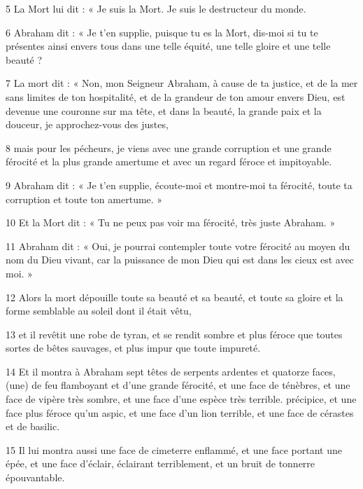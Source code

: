 \par 5 La Mort lui dit : « Je suis la Mort. Je suis le destructeur du monde.

\par 6 Abraham dit : « Je t'en supplie, puisque tu es la Mort, dis-moi si tu te présentes ainsi envers tous dans une telle équité, une telle gloire et une telle beauté ?

\par 7 La mort dit : « Non, mon Seigneur Abraham, à cause de ta justice, et de la mer sans limites de ton hospitalité, et de la grandeur de ton amour envers Dieu, est devenue une couronne sur ma tête, et dans la beauté, la grande paix et la douceur, je approchez-vous des justes,

\par 8 mais pour les pécheurs, je viens avec une grande corruption et une grande férocité et la plus grande amertume et avec un regard féroce et impitoyable.

\par 9 Abraham dit : « Je t’en supplie, écoute-moi et montre-moi ta férocité, toute ta corruption et toute ton amertume. »

\par 10 Et la Mort dit : « Tu ne peux pas voir ma férocité, très juste Abraham. »

\par 11 Abraham dit : « Oui, je pourrai contempler toute votre férocité au moyen du nom du Dieu vivant, car la puissance de mon Dieu qui est dans les cieux est avec moi. »

\par 12 Alors la mort dépouille toute sa beauté et sa beauté, et toute sa gloire et la forme semblable au soleil dont il était vêtu,

\par 13 et il revêtit une robe de tyran, et se rendit sombre et plus féroce que toutes sortes de bêtes sauvages, et plus impur que toute impureté.

\par 14 Et il montra à Abraham sept têtes de serpents ardentes et quatorze faces, (une) de feu flamboyant et d'une grande férocité, et une face de ténèbres, et une face de vipère très sombre, et une face d'une espèce très terrible. précipice, et une face plus féroce qu'un aspic, et une face d'un lion terrible, et une face de cérastes et de basilic.

\par 15 Il lui montra aussi une face de cimeterre enflammé, et une face portant une épée, et une face d'éclair, éclairant terriblement, et un bruit de tonnerre épouvantable.

